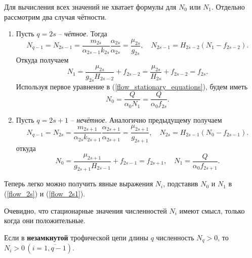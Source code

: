         Для вычисления всех значений не хватает формулы для \(N_0\) или \(N_1\). Отдельно рассмотрим два случая чётности.
        \begin{enumerate}
            \item Пусть \(q = 2s\) -- \textit{чётное}. Тогда
            \begin{equation*}
                N_{q-1} = N_{2s-1} = \frac{m_{2s}}{\alpha_{2s-1} k_{2s}} \frac{\alpha_{2s}}{\alpha_{2s}} = \frac{\mu_{2s}}{g_{2s}}, \quad N_{2s-1} = H_{2s-2} (N_1 - f_{2s-2}).
            \end{equation*}
            Откуда получаем
            \begin{equation*}
                N_1 = \frac{\mu_{2s}}{g_{2s} H_{2s-2}} + f_{2s-2} = \frac{\mu_{2s}}{H_{2s}} + f_{2s-2} = f_{2s}.
            \end{equation*}
            Используя первое уравнение в (\ref{flow_stationary_equations}), будем иметь
            \begin{equation*}
                N_0 = \frac{Q}{\alpha_0 N_1} = \frac{Q}{\alpha_0 f_{2s}}.
            \end{equation*}

            \item Пусть \(q = 2s+1\) -- \textit{нечётное}. Аналогично предыдущему получаем
            \begin{equation*}
                N_{q-1} = N_{2s} = \frac{m_{2s+1}}{\alpha_{2s} k_{2s+1}} \frac{\alpha_{2s+1}}{\alpha_{2s+1}} = \frac{\mu_{2s+1}}{g_{2s+1}}, \quad N_{2s} = H_{2s-1} (N_0 - f_{2s-1}).
            \end{equation*} 
            откуда
            \begin{equation*}
                N_0 = \frac{\mu_{2s+1}}{g_{2s+1} H_{2s-1}} + f_{2s-1} = f_{2s+1}, \quad N_1 = \frac{Q}{\alpha_0 f_{2s+1}}.
            \end{equation*}
        \end{enumerate}

        Теперь легко можно получить явные выражения \(N_i\), подставив \(N_0\) и \( N_1\) в (\ref{flow_2s}) и (\ref{flow_2s1}).

        Очевидно, что стационарные значения численностей \(N_i\) имеют смысл, только когда они положительные.

        \begin{statement}
            Если в \textbf{незамкнутой} трофической цепи длины \(q\) численность \(N_q > 0\), то \(N_i > 0 \, (i=\overline{1,q-1})\).
        \end{statement}


